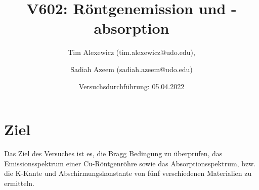 \documentclass[a4paper]{scrartcl}
\begin{document}
\title{V602: Röntgenemission und -absorption}
\author{Tim Alexewicz (tim.alexewicz@udo.edu), \and Sadiah Azeem (sadiah.azeem@udo.edu)}
\date{Versuchsdurchführung: 05.04.2022}

\maketitle
\thispagestyle{empty}
\newpage
\thispagestyle{empty}
\tableofcontents
\newpage
\setcounter{page}{1}

\section{Ziel}
Das Ziel des Versuches ist es, die Bragg Bedingung zu überprüfen, das Emissionsspektrum einer Cu-Röntgenröhre sowie das Absorptionsspektrum, bzw. die K-Kante und Abschirmungskonstante von fünf verschiedenen Materialien zu ermitteln.
\end{document}
